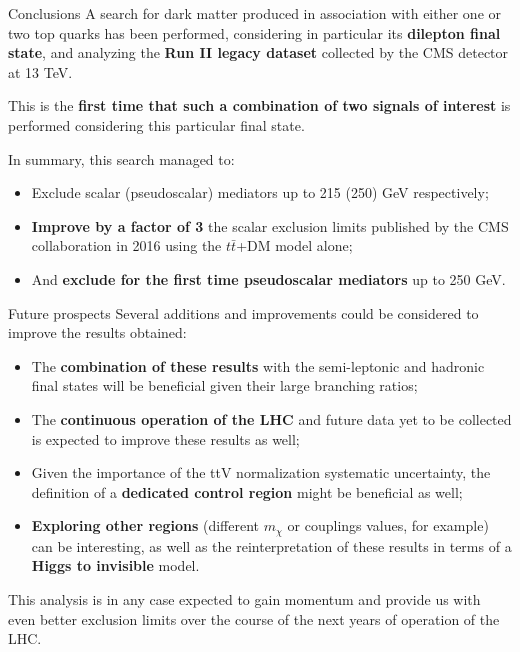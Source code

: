 \documentclass[8pt]{beamer}
\begin{document}
\begin{frame}{Conclusions}
\justifying
A search for \alert{dark matter produced in association with either one or two top quarks} has been performed, considering in particular its \textbf{dilepton final state}, and analyzing the \textbf{Run II legacy dataset} collected by the CMS detector at 13 TeV. \vfill

This is the \textbf{first time that such a combination of two signals of interest} is performed considering this particular final state. \vfill

In summary, this search managed to:
\begin{itemize}
\justifying
\item Exclude scalar (pseudoscalar) mediators up to 215 (250) GeV respectively;
\item \textbf{Improve by a factor of 3} the scalar exclusion limits published by the CMS collaboration in 2016 using the $t \bar t$+DM model alone;
\item And \textbf{exclude for the first time pseudoscalar mediators} up to 250 GeV.
\end{itemize} \vfill
\end{frame}

\begin{frame}{Future prospects}
\justifying
Several \alert{additions and improvements could be considered} to improve the results obtained:
\begin{itemize}
\justifying
\item The \textbf{combination of these results} with the semi-leptonic and hadronic final states will be beneficial given their large branching ratios;
\item The \textbf{continuous operation of the LHC} and future data yet to be collected is expected to improve these results as well;
\item Given the importance of the ttV normalization systematic uncertainty, the definition of a \textbf{dedicated control region} might be beneficial as well;
\item \textbf{Exploring other regions} (different $m_\chi$ or couplings values, for example) can be interesting, as well as the reinterpretation of these results in terms of a \textbf{Higgs to invisible} model.
\end{itemize} \vfill

This analysis is in any case \alert{expected to gain momentum and provide us with even better exclusion limits} over the course of the next years of operation of the LHC. \vfill
\end{frame}
\end{document}
